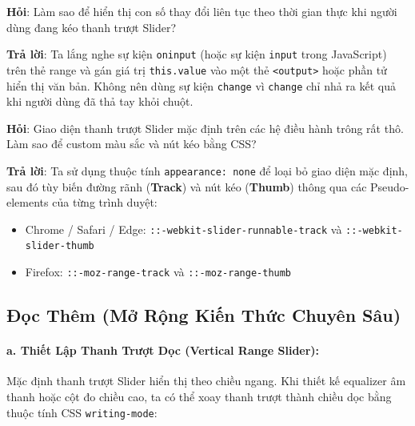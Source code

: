 \documentclass[11pt,oneside]{book}
\newcommand{\codeinline}[1]{\textcolor{accentOrange}{\texttt{#1}}}
\newcommand{\term}[1]{\textbf{\textcolor{primaryBlue}{#1}}}
\begin{document}
\begin{noteBox}
\textbf{Hỏi}: Làm sao để hiển thị con số thay đổi liên tục theo thời gian thực khi người dùng đang kéo thanh trượt Slider?
\par\vspace{3pt}
\textbf{Trả lời}: Ta lắng nghe sự kiện \codeinline{oninput} (hoặc sự kiện \codeinline{input} trong JavaScript) trên thẻ range và gán giá trị \codeinline{this.value} vào một thẻ \codeinline{<output>} hoặc phần tử hiển thị văn bản. Không nên dùng sự kiện \codeinline{change} vì \codeinline{change} chỉ nhả ra kết quả khi người dùng đã thả tay khỏi chuột.
\end{noteBox}

\begin{noteBox}
\textbf{Hỏi}: Giao diện thanh trượt Slider mặc định trên các hệ điều hành trông rất thô. Làm sao để custom màu sắc và nút kéo bằng CSS?
\par\vspace{3pt}
\textbf{Trả lời}: Ta sử dụng thuộc tính \codeinline{appearance: none} để loại bỏ giao diện mặc định, sau đó tùy biến đường rãnh (\term{Track}) và nút kéo (\term{Thumb}) thông qua các Pseudo-elements của từng trình duyệt:
\begin{itemize}[leftmargin=1.5em, itemsep=2pt, parsep=0pt]
    \item Chrome / Safari / Edge: \codeinline{::-webkit-slider-runnable-track} và \codeinline{::-webkit-slider-thumb}
    \item Firefox: \codeinline{::-moz-range-track} và \codeinline{::-moz-range-thumb}
\end{itemize}
\end{noteBox}

\subsection{Đọc Thêm (Mở Rộng Kiến Thức Chuyên Sâu)}
\label{subsec:range_advanced_readmore}

\paragraph{a. Thiết Lập Thanh Trượt Dọc (Vertical Range Slider):}
Mặc định thanh trượt Slider hiển thị theo chiều ngang. Khi thiết kế equalizer âm thanh hoặc cột đo chiều cao, ta có thể xoay thanh trượt thành chiều dọc bằng thuộc tính CSS \codeinline{writing-mode}:
\end{document}
